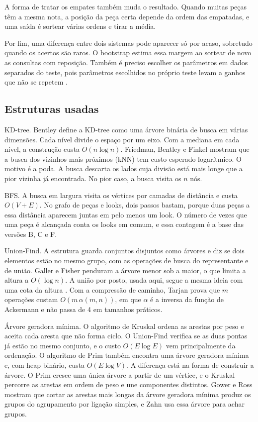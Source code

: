 \documentclass[conference]{IEEEtran}
\begin{document}
A forma de tratar os empates também muda o resultado. Quando muitas peças têm a mesma nota, a posição da peça certa depende da ordem das empatadas, e uma saída é sortear várias ordens e tirar a média.

Por fim, uma diferença entre dois sistemas pode aparecer só por acaso, sobretudo quando os acertos são raros. O bootstrap \cite{efron1979} estima essa margem ao sortear de novo as consultas com reposição. Também é preciso escolher os parâmetros em dados separados do teste, pois parâmetros escolhidos no próprio teste levam a ganhos que não se repetem \cite{dacrema2019}.

\subsection{Estruturas usadas}

KD-tree. Bentley \cite{bentley1975} define a KD-tree como uma árvore binária de busca em várias dimensões. Cada nível divide o espaço por um eixo. Com a mediana em cada nível, a construção custa $O(n \log n)$. Friedman, Bentley e Finkel \cite{friedman1977} mostram que a busca dos vizinhos mais próximos (kNN) tem custo esperado logarítmico. O motivo é a poda. A busca descarta os lados cuja divisão está mais longe que a pior vizinha já encontrada. No pior caso, a busca visita os $n$ nós.

BFS. A busca em largura visita os vértices por camadas de distância e custa $O(V+E)$. No grafo de peças e looks, dois passos bastam, porque duas peças a essa distância aparecem juntas em pelo menos um look. O número de vezes que uma peça é alcançada conta os looks em comum, e essa contagem é a base das versões B, C e F.

Union-Find. A estrutura guarda conjuntos disjuntos como árvores e diz se dois elementos estão no mesmo grupo, com as operações de busca do representante e de união. Galler e Fisher \cite{galler1964} penduram a árvore menor sob a maior, o que limita a altura a $O(\log n)$. A união por posto, usada aqui, segue a mesma ideia com uma cota da altura \cite{tarjan1975}. Com a compressão de caminho, Tarjan \cite{tarjan1975} prova que $m$ operações custam $O(m\,\alpha(m,n))$, em que $\alpha$ é a inversa da função de Ackermann e não passa de 4 em tamanhos práticos.

Árvore geradora mínima. O algoritmo de Kruskal \cite{kruskal1956} ordena as arestas por peso e aceita cada aresta que não forma ciclo. O Union-Find verifica se as duas pontas já estão no mesmo conjunto, e o custo $O(E \log E)$ vem principalmente da ordenação. O algoritmo de Prim \cite{prim1957} também encontra uma árvore geradora mínima e, com heap binário, custa $O(E \log V)$. A diferença está na forma de construir a árvore. O Prim cresce uma única árvore a partir de um vértice, e o Kruskal percorre as arestas em ordem de peso e une componentes distintos. Gower e Ross \cite{gower1969} mostram que cortar as arestas mais longas da árvore geradora mínima produz os grupos do agrupamento por ligação simples, e Zahn \cite{zahn1971} usa essa árvore para achar grupos.
\end{document}
